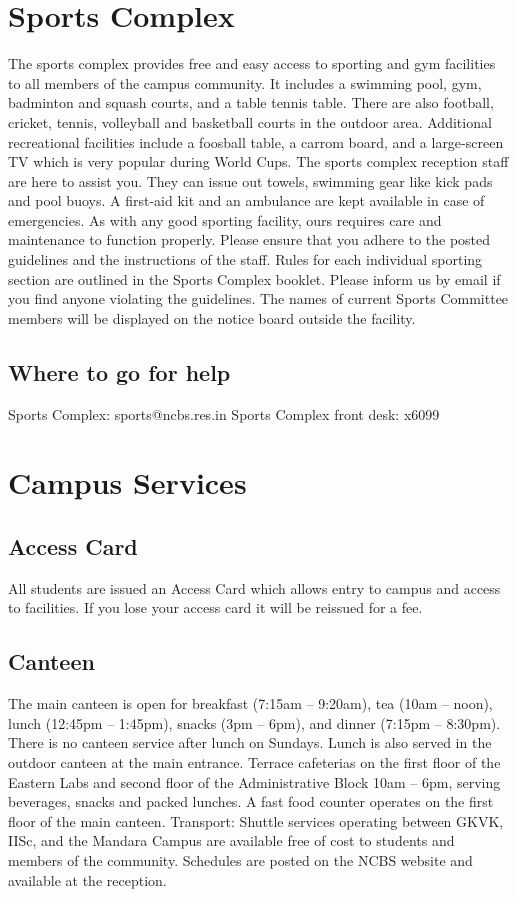 \documentclass[a4paper]{extarticle}
\begin{document}
\section{Sports Complex}
The sports complex provides free and easy access to sporting and gym facilities to all
members of the campus community. It includes a swimming pool, gym, badminton and
squash courts, and a table tennis table. There are also football, cricket, tennis, volleyball and
basketball courts in the outdoor area. Additional recreational facilities include a foosball
table, a carrom board, and a large-screen TV which is very popular during World Cups. The
sports complex reception staff are here to assist you. They can issue out towels, swimming
gear like kick pads and pool buoys. A first-aid kit and an ambulance are kept available in
case of emergencies. As with any good sporting facility, ours requires care and maintenance
to function properly. Please ensure that you adhere to the posted guidelines and the
instructions of the staff. Rules for each individual sporting section are outlined in the Sports
Complex booklet. Please inform us by email if you find anyone violating the guidelines. The
names of current Sports Committee members will be displayed on the notice board outside
the facility.

\subsection{Where to go for help}
Sports Complex: sports@ncbs.res.in
Sports Complex front desk: x6099

\section{Campus Services}
\subsection{Access Card}
All students are issued an Access Card which allows entry to campus and
access to facilities. If you lose your access card it will be reissued for a fee.

\subsection{Canteen}
The main canteen is open for breakfast (7:15am – 9:20am), tea (10am – noon),
lunch (12:45pm – 1:45pm), snacks (3pm – 6pm), and dinner (7:15pm – 8:30pm). There is no
canteen service after lunch on Sundays. Lunch is also served in the outdoor canteen at the
main entrance. Terrace cafeterias on the first floor of the Eastern Labs and second floor of
the Administrative Block 10am – 6pm, serving beverages, snacks and packed lunches. A
fast food counter operates on the first floor of the main canteen.
Transport: Shuttle services operating between GKVK, IISc, and the Mandara Campus are
available free of cost to students and members of the community. Schedules are posted on
the NCBS website and available at the reception.
\end{document}
